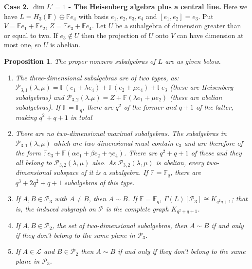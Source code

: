 \documentclass[11pt]{amsart}
\theoremstyle{plain}
\newtheorem{proposition}[theorem]{Proposition}
\def\F{\mathbb{F}}
\begin{document}
 \textbf{Case 2. $\dim L'=1$ - The Heisenberg algebra plus a central line.}
 Here we have $L=H_3(\F)\oplus \F e_4$ with basis $e_1,e_2,e_3,e_4$ and $[e_1,e_2]=e_3$. Put $V=\F e_1+\F e_2$, $Z=\F e_3+\F e_4$. Let $U$ be a subalgebra of dimension greater than or equal to two. If $e_3\notin U$ then the projection of $U$ onto $V$ can have dimension at most one, so $U$ is abelian. 
\begin{proposition}\label{heis+}  The proper nonzero subalgebras of $L$ are as given below.
\begin{enumerate}
 \item The three-dimensional subalgebras are of two types, as: $\mathcal{P}_{3,1}(\lambda,\mu)= \F(e_1+\lambda e_4)+\F(e_2+\mu e_4)+\F e_3$ (these are Heisenberg subalgebras) and $\mathcal{P}_{3,2}(\lambda.\mu)=Z+\F(\lambda e_1+\mu e_2)$ (these are abelian subalgebras). If $\F=\F_q$, there are $q^2$ of the former and $q+1$ of the latter, making $q^2+q+1$ in total 
 \item There are no two-dimensional maximal subalgebras. The subalgebras in $\mathcal{P}_{3,1}(\lambda,\mu)$ which are two-dimensional must contain $e_3$ and are therefore of the form $\F e_3+\F(\alpha e_1+\beta e_2+\gamma e_4)$. There are $q^2+q+1$ of these and they all belong to $\mathcal{P}_{3,2}(\lambda,\mu)$ also. As $\mathcal{P}_{3,2}(\lambda,\mu)$ is abelian, every two-dimensional subspace of it is a subalgebra. If $\F=\F_q$, there are $q^3+2q^2+q+1$ subalgebras of this type.
 \item  If $A, B \in \mathcal{P}_3$ with $A \neq B$, then $A \sim B$. If $\F=\F_q$, $\Gamma(L)[\mathcal{P}_3]\cong K_{q^2q+1}$; that is, the induced subgraph on $\mathcal{P}$ is the complete graph $K_{q^2+q+1}$.
\item If $A,B\in \mathcal{P}_2$, the set of two-dimensional subalgebras, then $A\sim B$ if and only if they don't belong to the same plane in $\mathcal{P}_3$.
\item If $A\in \mathcal{L}$ and $B\in \mathcal{P}_2$ then $A\sim B$ if and only if they don't belong to the same plane in $\mathcal{P}_3$.
 \end{enumerate}
\end{proposition} 
\end{document}
